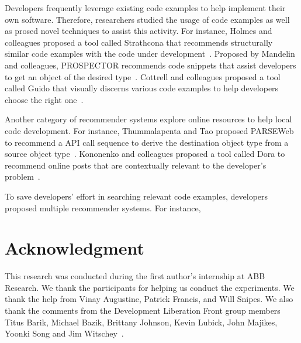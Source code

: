 Developers frequently leverage existing code examples to help implement their
own software. Therefore, researchers studied the usage of code examples as well
as prosed novel techniques to assist this activity. For instance, Holmes and
colleagues proposed a tool called Strathcona that recommends structurally
similar code examples with the code under development~\cite{Holmes2}.
Proposed by Mandelin and colleagues, PROSPECTOR recommends code snippets that
assist developers to get an object of the desired type~\cite{Mandelin}. Cottrell
and colleagues proposed a tool called Guido that visually discerns various code
examples to help developers choose the right one~\cite{Cottrell}.

Another category of recommender systems explore online resources to help local
code development. For instance, Thummalapenta and Tao proposed PARSEWeb to
recommend a API call sequence to derive the destination object type from a
source object type~\cite{Thummalapenta}. Kononenko and colleagues proposed a
tool called Dora to recommend online posts that are contextually relevant to the
developer's problem~\cite{Kononenko}.

To save developers' effort in searching relevant code examples, developers
proposed multiple recommender systems. For instance,  





\section*{Acknowledgment}
This research was conducted during the first author's internship at ABB
Research. We thank the participants for helping us conduct the experiments. We
thank the help from Vinay Augustine, Patrick Francis, and Will Snipes. We also
thank the comments from the Development Liberation Front group members Titus
Barik, Michael Bazik, Brittany Johnson, Kevin Lubick, John Majikes, Yoonki Song
and Jim Witschey~\cite{Bacchelli}.






